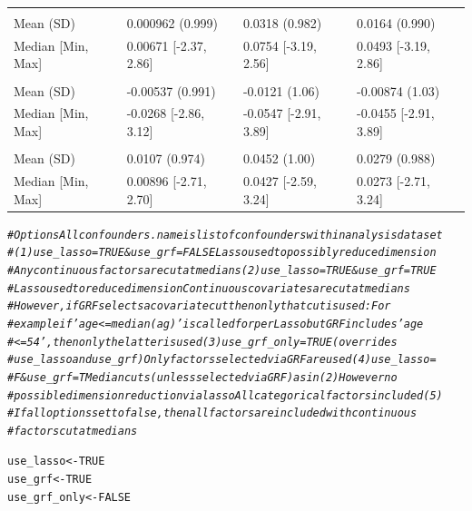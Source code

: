 \documentclass[smallextended]{svjour3}
\makeatletter
\newcommand{\hlnum}[1]{\textcolor[rgb]{0.686,0.059,0.569}{#1}}%
\newcommand{\hlcom}[1]{\textcolor[rgb]{0.678,0.584,0.686}{\textit{#1}}}%
\newcommand{\hlstd}[1]{\textcolor[rgb]{0.345,0.345,0.345}{#1}}%
\newcommand{\hlkwb}[1]{\textcolor[rgb]{0.69,0.353,0.396}{#1}}%
\newenvironment{kframe}{%
 \def\at@end@of@kframe{}%
 \ifinner\ifhmode%
  \def\at@end@of@kframe{\end{minipage}}%
  \begin{minipage}{\columnwidth}%
 \fi\fi%
 \def\FrameCommand##1{\hskip\@totalleftmargin \hskip-\fboxsep
 \colorbox{shadecolor}{##1}\hskip-\fboxsep
     \hskip-\linewidth \hskip-\@totalleftmargin \hskip\columnwidth}%
 \MakeFramed {\advance\hsize-\width
   \@totalleftmargin\z@ \linewidth\hsize
   \@setminipage}}%
 {\par\unskip\endMakeFramed%
 \at@end@of@kframe}
\newenvironment{knitrout}{}{} %
\makeatother
\begin{document}
\begin{knitrout}
\begin{tabular}[t]{llll}
\addlinespace[0.3em]
\multicolumn{4}{l}{\textbf{noise1}}\\
\hspace{1em}Mean (SD) & 0.000962 (0.999) & 0.0318 (0.982) & 0.0164 (0.990)\\
\hspace{1em}Median [Min, Max] & 0.00671 [-2.37, 2.86] & 0.0754 [-3.19, 2.56] & 0.0493 [-3.19, 2.86]\\
\addlinespace[0.3em]
\multicolumn{4}{l}{\textbf{noise2}}\\
\hspace{1em}Mean (SD) & -0.00537 (0.991) & -0.0121 (1.06) & -0.00874 (1.03)\\
\hspace{1em}Median [Min, Max] & -0.0268 [-2.86, 3.12] & -0.0547 [-2.91, 3.89] & -0.0455 [-2.91, 3.89]\\
\addlinespace[0.3em]
\multicolumn{4}{l}{\textbf{noise3}}\\
\hspace{1em}Mean (SD) & 0.0107 (0.974) & 0.0452 (1.00) & 0.0279 (0.988)\\
\hspace{1em}Median [Min, Max] & 0.00896 [-2.71, 2.70] & 0.0427 [-2.59, 3.24] & 0.0273 [-2.71, 3.24]\\
\bottomrule
\end{tabular}

\begin{kframe}\begin{alltt}
\hlcom{# Options Allconfounders.name is list of confounders within analysis dataset}
\hlcom{# (1) use_lasso=TRUE & use_grf=FALSE Lasso used to possibly reduce dimension}
\hlcom{# Any continuous factors are cut at medians (2) use_lasso=TRUE & use_grf=TRUE}
\hlcom{# Lasso used to reduce dimension Continuous covariates are cut at medians}
\hlcom{# However, if GRF selects a covariate cut then only that cut is used: For}
\hlcom{# example if 'age <= median(ag)' is called for per Lasso but GRF includes 'age}
\hlcom{# <= 54', then only the latter is used (3) use_grf_only = TRUE (overrides}
\hlcom{# use_lasso and use_grf) Only factors selected via GRF are used (4) use_lasso =}
\hlcom{# F & use_grf =T Median cuts (unless selected via GRF) as in (2) However no}
\hlcom{# possible dimension reduction via lasso All categorical factors included (5)}
\hlcom{# If all options set to false, then all factors are included with continuous}
\hlcom{# factors cut at medians}

\hlstd{use_lasso} \hlkwb{<-} \hlnum{TRUE}
\hlstd{use_grf} \hlkwb{<-} \hlnum{TRUE}
\hlstd{use_grf_only} \hlkwb{<-} \hlnum{FALSE}


\end{alltt}
\end{kframe}
\end{knitrout}
\end{document}
